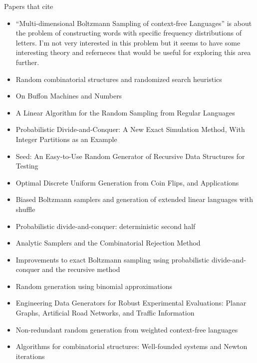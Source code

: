 Papers that cite~\cite{DBLP:journals/cpc/DuchonFLS04}

\begin{itemize}
\item ``Multi-dimensional Boltzmann Sampling of context-free Languages''\cite{DBLP:journals/corr/abs-1002-0046} is about the problem of constructing words with specific frequency distributions of letters.
I'm not very interested in this problem but it seems to have some interesting theory and referneces that would be useful for exploring this area further.
\item Random combinatorial structures and randomized search heuristics\cite{DBLP:phd/de/Johannsen2010}
\item On Buffon Machines and Numbers\cite{DBLP:conf/soda/FlajoletPS11}
\item A Linear Algorithm for the Random Sampling from Regular Languages\cite{DBLP:journals/algorithmica/BernardiG12}
\item Probabilistic Divide-and-Conquer: A New Exact Simulation Method, With Integer Partitions as an Example\cite{DBLP:journals/cpc/ArratiaD16}
\item Seed: An Easy-to-Use Random Generator of Recursive Data Structures for Testing\cite{DBLP:conf/icst/HeamN11}
\item Optimal Discrete Uniform Generation from Coin Flips, and Applications\cite{DBLP:journals/corr/abs-1304-1916}
\item Biased Boltzmann samplers and generation of extended linear languages with shuffle\cite{darrasse2012biased}
\item Probabilistic divide-and-conquer: deterministic second half\cite{arratia_desalvo_2016}
\item Analytic Samplers and the Combinatorial Rejection Method\cite{DBLP:conf/analco/BodiniLR15}
\item Improvements to exact Boltzmann sampling using probabilistic divide-and-conquer and the recursive method\cite{DBLP:journals/endm/Desalvo17}
\item Random generation using binomial approximations\cite{gouyou2010random}
\item Engineering Data Generators for Robust Experimental Evaluations: Planar Graphs, Artificial Road Networks, and Traffic Information\cite{DBLP:phd/dnb/Meinert12}
\item Non-redundant random generation from weighted context-free languages\cite{DBLP:journals/corr/abs-1012-4560}
\item Algorithms for combinatorial structures: Well-founded systems and Newton iterations\cite{DBLP:journals/jct/PivoteauSS12}

\end{itemize}
